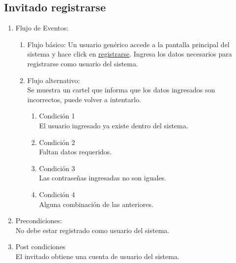 \documentclass[a4paper,11pt]{article}
\begin{document}
\subsection{Invitado registrarse}
\begin{enumerate}


	\begin{enumerate}
		\item Descripción breve: \\
			Obtener una cuenta de usuario del sistema.
		\item Actores \\
			Invitado.
	
		\item Disparadores: \\
			Click en \underline{registrarse} en la pantalla principal del sistema.

	\end{enumerate}

	\item Flujo de Eventos: 

	\begin{enumerate}
		\item Flujo básico:
			Un usuario gen\'erico accede a la pantalla principal del sistema y
			hace click en \underline{registrarse}. Ingresa los datos necesarios
			para registrarse como usuario del sistema.

		\item Flujo alternativo:\\
			Se muestra un cartel que informa que los datos ingresados son
			incorrectos, puede volver a intentarlo.

			\begin{enumerate}
			\item Condición 1 \\
				El usuario ingresado ya existe dentro del sistema.
			\item Condición 2 \\
				Faltan datos requeridos.
			\item Condición 3 \\
				Las contrase\~nas ingresadas no son iguales.
			\item Condición 4 \\
				Alguna combinaci\'on de las anteriores.
			\end{enumerate}

	\end{enumerate}

	\item Precondiciones: \\
		No debe estar registrado como usuario del sistema.

	\item Post condiciones \\
		El invitado obtiene una cuenta de usuario del sistema.

\end{enumerate}
\end{document}
